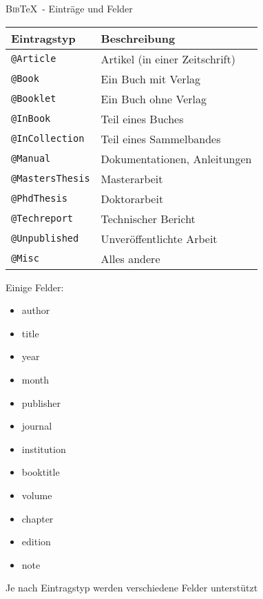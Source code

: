 \documentclass[aspectratio=169]{beamer}
\providecommand{\tightlist}{\setlength{\itemsep}{0pt}\setlength{\parskip}{0pt}}
\newcommand\citestyle[1]{\textcolor{foreground-secondary}{\textsuperscript{#1}}}
\let\oldcite=\cite
\renewcommand{\cite}[1]{\citestyle{\oldcite{#1}}}
\let\oldautocite\autocite
\renewcommand{\autocite}[1]{\citestyle{\oldautocite{#1}}}
\begin{document}
    \begin{frame}[fragile]{\textsc{Bib}\TeX~- Einträge und Felder}
    \protect\hypertarget{eintruxe4ge-und-felder}{}
    \begin{minipage}{0.7\textwidth}

    \begin{longtable}[]{@{}ll@{}}
    \toprule()
    Eintragstyp & Beschreibung \\
    \midrule()
    \endhead
    \texttt{@Article} & Artikel (in einer Zeitschrift) \cite{bibtex} \\
    \texttt{@Book} & Ein Buch mit Verlag \cite{bibtex} \\
    \texttt{@Booklet} & Ein Buch ohne Verlag \cite{bibtex} \\
    \texttt{@InBook} & Teil eines Buches \cite{bibtex} \\
    \texttt{@InCollection} & Teil eines Sammelbandes \cite{bibtex} \\
    \texttt{@Manual} & Dokumentationen, Anleitungen \cite{bibtex} \\
    \texttt{@MastersThesis} & Masterarbeit \cite{bibtex} \\
    \texttt{@PhdThesis} & Doktorarbeit \cite{bibtex} \\
    \texttt{@Techreport} & Technischer Bericht \cite{bibtex} \\
    \texttt{@Unpublished} & Unveröffentlichte Arbeit \cite{bibtex} \\
    \texttt{@Misc} & Alles andere \cite{bibtex} \\
    \bottomrule()
    \end{longtable}

    \end{minipage}\begin{minipage}{0.3\textwidth}

    \phantom{m}Einige Felder: \autocite{bibtex}

    \begin{itemize}
    \tightlist
    \item
      author
    \item
      title
    \item
      year
    \item
      month
    \item
      publisher
    \item
      journal
    \item
      institution
    \item
      booktitle
    \item
      volume
    \item
      chapter
    \item
      edition
    \item
      note
    \end{itemize}

    \vfill

    \end{minipage}

    Je nach Eintragstyp werden verschiedene Felder unterstützt
    \autocite{bibtex}
    \end{frame}
\end{document}
